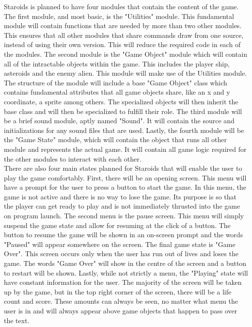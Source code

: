 \documentclass{article}
\begin{document}
Staroids is planned to have four modules that contain the content of the game. The first module, and most basic, is the "Utilities" module. This fundamental module will contain functions that are needed by more than two other modules. This ensures that all other modules that share commands draw from one source, instead of using their own version. This will reduce the required code in each of the modules. The second module is the "Game Object" module which will contain all of the intractable objects within the game. This includes the player ship, asteroids and the enemy alien. This module will make use of the Utilities module. The structure of the module will include a base "Game Object" class which contains fundamental attributes that all game objects share, like an x and y coordinate, a sprite among others. The specialized objects will then inherit the base class and will then be specialized to fulfill their role. The third module will be a brief sound module, aptly named "Sound". It will contain the source and initializations for any sound files that are used. Lastly, the fourth module will be the "Game State" module, which will contain the object that runs all other module and represents the actual game. It will contain all game logic required for the other modules to interact with each other.\\
There are also four main states planned for Staroids that will enable the user to play the game comfortably. First, there will be an opening screen. This menu will have a prompt for the user to press a button to start the game. In this menu, the game is not active and there is no way to lose the game. Its purpose is so that the player can get ready to play and is not immediately thrusted into the game on program launch. The second menu is the pause screen. This menu will simply suspend the game state and allow for resuming at the click of a button. The button to resume the game will be shown in an on-screen prompt and the words "Paused" will appear somewhere on the screen. The final game state is "Game Over". This screen occurs only when the user has run out of lives and loses the game. The words "Game Over" will show in the centre of the screen and a button to restart will be shown. Lastly, while not strictly a menu, the "Playing" state will have constant information for the user. The majority of the screen will be taken up by the game, but in the top right corner of the screen, there will be a life count and score. These amounts can always be seen, no matter what menu the user is in and will always appear above game objects that happen to pass over the text.\\
\end{document}
